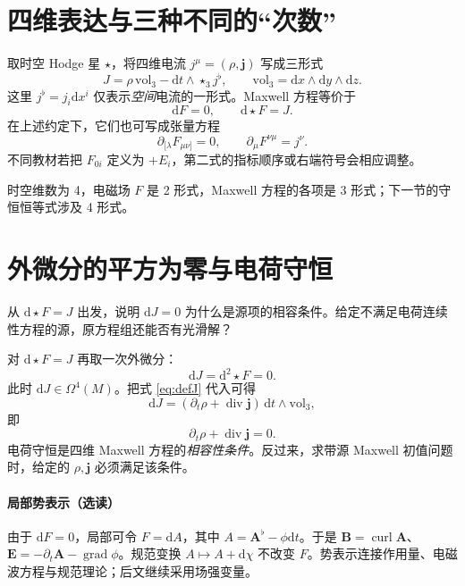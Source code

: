\documentclass[UTF8,11pt,openany]{ctexbook}
\numberwithin{equation}{chapter}
\theoremstyle{definition}
\theoremstyle{remark}
\newcommand{\dd}{\mathrm d}
\newcommand{\vol}{\mathrm{vol}}
\newcommand{\grad}{\operatorname{grad}}
\newcommand{\Div}{\operatorname{div}}
\newcommand{\curl}{\operatorname{curl}}
\newcommand{\starS}{\star_3}
\begin{document}
\section{四维表达与三种不同的“次数”}
取时空 Hodge 星 $\star$，将四维电流 $j^\mu=(\rho,\bm j)$ 写成三形式
\begin{equation}\label{eq:defJ}
J=\rho\,\vol_3-\dd t\wedge\starS j^\flat,
\qquad \vol_3=\dd x\wedge\dd y\wedge\dd z.
\end{equation}
这里 $j^\flat=j_i\dd x^i$ 仅表示\emph{空间}电流的一形式。Maxwell 方程等价于
\begin{equation}\label{eq:4maxwell}
\boxed{\dd F=0,\qquad \dd\star F=J.}
\end{equation}
在上述约定下，它们也可写成张量方程
\begin{equation}
\partial_{[\lambda}F_{\mu\nu]}=0,
\qquad \partial_\mu F^{\nu\mu}=j^\nu.
\end{equation}
不同教材若把 $F_{0i}$ 定义为 $+E_i$，第二式的指标顺序或右端符号会相应调整。

时空维数为 4，电磁场 $F$ 是 2 形式，Maxwell 方程的各项是 3 形式；下一节的守恒恒等式涉及 4 形式。

\section{外微分的平方为零与电荷守恒}
\begin{checkpoint}
从 $\dd\star F=J$ 出发，说明 $\dd J=0$ 为什么是源项的相容条件。给定不满足电荷连续性方程的源，原方程组还能否有光滑解？
\end{checkpoint}
对 $\dd\star F=J$ 再取一次外微分：
\begin{equation}\label{eq:dJ}
\dd J=\dd^2\star F=0.
\end{equation}
此时 $\dd J\in\Omega^4(M)$。把式 \eqref{eq:defJ} 代入可得
\begin{equation}
\dd J=(\partial_t\rho+\Div\bm j)\,
\dd t\wedge\vol_3,
\end{equation}
即
\begin{equation}\label{eq:continuity}
\boxed{\partial_t\rho+\Div\bm j=0.}
\end{equation}
电荷守恒是四维 Maxwell 方程的\emph{相容性条件}。反过来，求带源 Maxwell 初值问题时，给定的 $\rho,\bm j$ 必须满足该条件。

\paragraph{局部势表示（选读）}
由于 $\dd F=0$，局部可令 $F=\dd A$，其中 $A=\bm A^\flat-\phi\dd t$。于是 $\bm B=\curl\bm A$、$\bm E=-\partial_t\bm A-\grad\phi$。规范变换 $A\mapsto A+\dd\chi$ 不改变 $F$。势表示连接作用量、电磁波方程与规范理论；后文继续采用场强变量。
\end{document}
